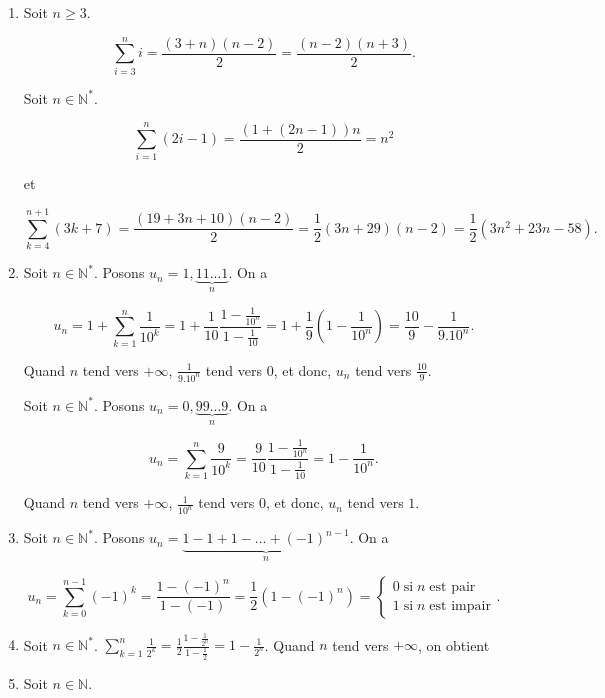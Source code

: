 \documentclass[11pt,a4paper]{article}
\newcommand{\Nn}{\mathbb{N}} \newcommand{\N}{\mathbb{N}}
\begin{document}
\begin{enumerate}
\item  Soit $n\geq3$.

$$\sum_{i=3}^{n}i=\frac{(3+n)(n-2)}{2}=\frac{(n-2)(n+3)}{2}.$$

Soit $n\in\Nn^*$.

$$\sum_{i=1}^{n}(2i-1)=\frac{(1+(2n-1))n}{2}=n^2$$

et

$$\sum_{k=4}^{n+1}(3k+7)=\frac{(19+3n+10)(n-2)}{2}=\frac{1}{2}(3n+29)(n-2)=\frac{1}{2}(3n^2+23n-58).$$

\item  Soit $n\in\Nn^*$. Posons $u_n=1,\underbrace{11...1}_n$. On a

$$u_n=1+\sum_{k=1}^{n}\frac{1}{10^k}=1+\frac{1}{10}\frac{1-\frac{1}{10^n}}{1-\frac{1}{10}}
=1+\frac{1}{9}(1-\frac{1}{10^n})=\frac{10}{9}-\frac{1}{9.10^n}.$$

Quand $n$ tend vers $+\infty$, $\frac{1}{9.10^n}$ tend vers $0$, et donc, $u_n$ tend vers $\frac{10}{9}$.
\begin{center}
\end{center}

Soit $n\in\Nn^*$. Posons $u_n=0,\underbrace{99...9}_n$. On a

$$u_n=\sum_{k=1}^{n}\frac{9}{10^k}=\frac{9}{10}\frac{1-\frac{1}{10^n}}{1-\frac{1}{10}}
=1-\frac{1}{10^n}.$$

Quand $n$ tend vers $+\infty$, $\frac{1}{10^n}$ tend vers $0$, et donc, $u_n$ tend vers $1$.
\begin{center}
\end{center}

\item  Soit $n\in\Nn^*$. Posons $u_n=\underbrace{1-1+1-...+(-1)^{n-1}}_n$.  On a

$$u_n=\sum_{k=0}^{n-1}(-1)^k=\frac{1-(-1)^n}{1-(-1)}=\frac{1}{2}(1-(-1)^n)=\left\{
\begin{array}{l}
0\;\mbox{si}\;n\;\mbox{est pair}\\
1\;\mbox{si}\;n\;\mbox{est impair}
\end{array}
\right..$$

\item  Soit $n\in\Nn^*$.
$\sum_{k=1}^{n}\frac{1}{2^k}=\frac{1}{2}\frac{1-\frac{1}{2^n}}{1-\frac{1}{2}}=1-\frac{1}{2^n}$. Quand $n$ tend vers
$+\infty$, on obtient
\begin{center}
\end{center}
\item  Soit $n\in\Nn$.


\end{enumerate}
\end{document}
